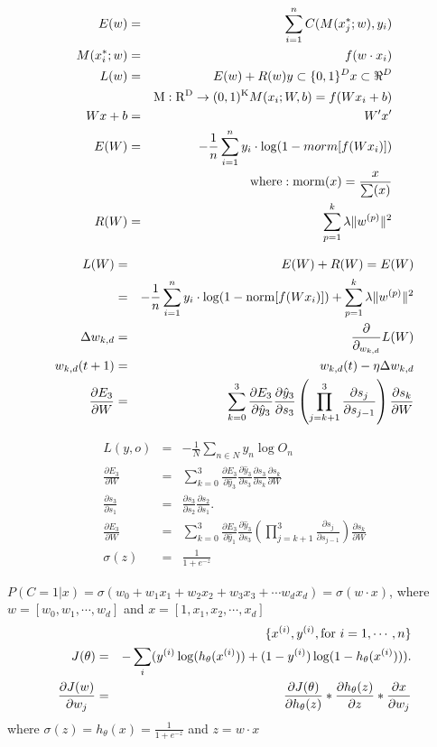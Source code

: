 \begin{eqnarray*}
E(w)&=&\sum^n_{i=1}C(M(x_j^*;w),y_i)\\
M(x_i^*;w)&=&f(w\cdot x_i)\\
L(w)&=&E(w)+R(w)y\subset\{0,1\}^Dx\subset\Re^D\\
&&{\rm M}:{\rm R}^{\rm D}\to(0,1)^{\rm K}M(x_i;W,b)=f(Wx_i+b)\\
Wx+b&=&W'x'\\
E(W)&=&-\frac{1}{n}\sum^n_{i=1}y_i\cdot\log(1-morm[f(Wx_i)])\\
&&{\rm where}:{\rm morm}(x)=\frac{x}{\sum(x)}\\
R(W)&=&\sum^k_{p=1}\lambda\|w^{(p)}\|^2
\end{eqnarray*}

\begin{eqnarray*}
L(W)&=&E(W)+R(W)=E(W)\\
&=&-\frac{1}{n}\sum^n_{i=1}y_i\cdot\log(1-{\rm norm}[f(Wx_i)])+\sum^k_{p=1}\lambda\|w^{(p)}\|^2\\
\Delta w_{k,d}&=&\frac{\partial}{\partial_{w_{k,d}}}L(W)\\
w_{k,d}(t+1)&=&w_{k,d}(t)-\eta\Delta w_{k,d}\\
\frac{\partial E_3}{\partial W}&=&\sum^3_{k=0}\frac{\partial E_3}{\partial \hat{y}_3}
\frac{\partial \hat{y}_3}{\partial s_3}\left(\prod^3_{j=k+1}\frac{\partial s_j}{\partial s_{j-1}}\right)\frac{\partial s_k}{\partial W}
\end{eqnarray*}

\begin{eqnarray*}
L(y,o)&=&-\frac{1}{N}\sum_{n\in N}y_n\log O_n\\
\frac{\partial E_3}{\partial W}&=&\sum^3_{k=0}\frac{\partial E_3}{\partial\hat{y}_3}
\frac{\partial\hat{y}_3}{\partial s_3}\frac{\partial s_3}{\partial s_k}\frac{\partial s_k}{\partial W}\\
\frac{\partial s_3}{\partial s_1}&=&\frac{\partial s_3}{\partial s_2}\frac{\partial s_2}{\partial s_1}.\\
\frac{\partial E_3}{\partial W}&=&\sum^3_{k=0}\frac{\partial E_3}{\partial \hat{y}_1}
\frac{\partial \hat{y}_3}{\partial s_3}\left(\prod^3_{j=k+1}
\frac{\partial s_j}{\partial s_{j-1}}\right)\frac{\partial s_k}{\partial W}\\
\sigma(z)&=&\frac{1}{1+e^{-z}}
\end{eqnarray*}

$P(C=1|x)=\sigma(w_0+w_1x_1+w_2x_2+w_3x_3+\cdots w_dx_d)=\sigma(w\cdot x)$, where
$w=[w_0,w_1,\cdots,w_d]$ and $x=[1,x_1,x_2,\cdots,x_d]$
\begin{eqnarray*}
&&\{x^{(i)},y^{(i)},{\rm for}~i=1,\cdots,n\}\\
J(\theta)&=&-\sum_{i}(y^{(i)}\log(h_{\theta}(x^{(i)}))+(1-y^{(i)})\log(1-h_{\theta}(x^{(i)}))).\\
\frac{\partial J(w)}{\partial w_j}&=&\frac{\partial J(\theta)}{\partial h_{\theta}(z)}*
\frac{\partial h_{\theta}(z)}{\partial z}*\frac{\partial x}{\partial w_j}
\end{eqnarray*}
where $\sigma(z)=h_{\theta}(x)=\frac{1}{1+e^{-z}}$ and $z=w\cdot x$

